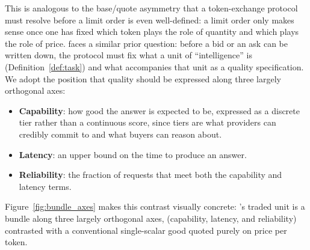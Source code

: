 This is analogous to the base/quote asymmetry that a token-exchange protocol
must resolve before a limit order is even well-defined: a limit order only
makes sense once one has fixed which token plays the role of quantity and which
plays the role of price. \Noesis{} faces a similar prior question: before a bid
or an ask can be written down, the protocol must fix what a unit of
``intelligence'' is (Definition~\ref{def:task}) and what accompanies that
unit as a quality specification. We adopt the position that quality should be
expressed along three largely orthogonal axes:

\begin{itemize}
  \item \textbf{Capability}: how good the answer is expected to be,
    expressed as a discrete tier rather than a continuous score, since
    tiers are what providers can credibly commit to and what buyers can
    reason about.
  \item \textbf{Latency}: an upper bound on the time to produce an answer.
  \item \textbf{Reliability}: the fraction of requests that meet both the
    capability and latency terms.
\end{itemize}

Figure~\ref{fig:bundle_axes} makes this contrast visually concrete: \Noesis{}'s
traded unit is a bundle along three largely orthogonal axes, (capability,
latency, and reliability) contrasted with a conventional single-scalar good
quoted purely on price per token.

